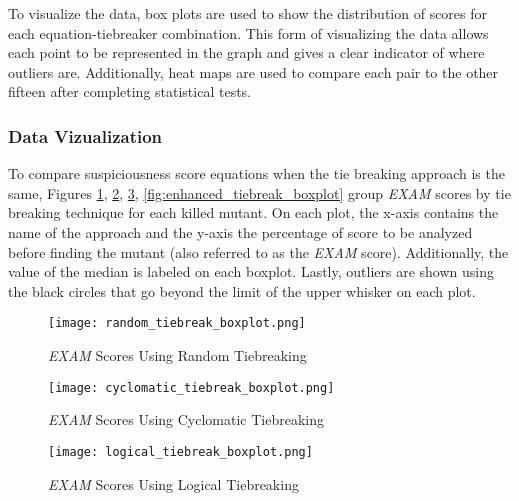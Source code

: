 To visualize the data, box plots are
used to show the distribution of scores for each equation-tiebreaker
combination. This form of visualizing the data allows each point to be
represented in the graph and gives a clear indicator of where outliers are.
Additionally, heat maps are used to compare each pair to the other fifteen after
completing statistical tests.

\subsubsection{Data Vizualization}
\label{subsubsec:data_vizualization}

To compare suspiciousness score equations when the tie breaking approach is the
same, Figures \ref{fig:random_tiebreak_boxplot},
\ref{fig:cyclomatic_tiebreak_boxplot}, \ref{fig:logical_tiebreak_boxplot}, \ref{fig:enhanced_tiebreak_boxplot}
group \emph{EXAM} scores by tie breaking technique for each killed mutant. On
each plot, the x-axis contains the name of the approach and the y-axis the
percentage of score to be analyzed before finding the mutant (also referred to
as the \emph{EXAM} score). Additionally, the value of the median is labeled on
each boxplot. Lastly, outliers are shown using the black circles that go beyond
the limit of the upper whisker on each plot.

\begin{figure}[!htb]
	\begin{center}
		\texttt{[image: random\_tiebreak\_boxplot.png]}
		\caption{\label{fig:random_tiebreak_boxplot} \emph{EXAM} Scores Using
		Random Tiebreaking}
	\end{center}
\end{figure}

\begin{figure}[!htb]
	\begin{center}
		\texttt{[image: cyclomatic\_tiebreak\_boxplot.png]}
		\caption{\label{fig:cyclomatic_tiebreak_boxplot} \emph{EXAM} Scores Using
		Cyclomatic Tiebreaking}
	\end{center}
\end{figure}

\begin{figure}[!htb]
	\begin{center}
		\texttt{[image: logical\_tiebreak\_boxplot.png]}
		\caption{\label{fig:logical_tiebreak_boxplot} \emph{EXAM} Scores Using
		Logical Tiebreaking}
	\end{center}
\end{figure}

